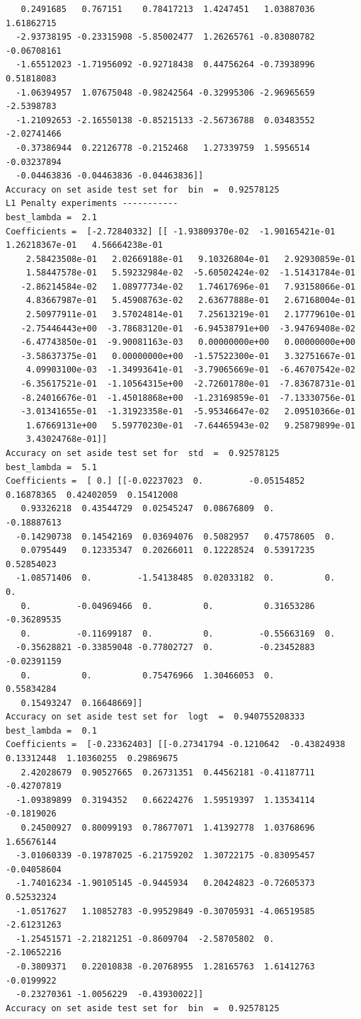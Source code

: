 \documentclass{article}
\begin{document}
\begin{tiny}
\begin{lstlisting}
   0.2491685   0.767151    0.78417213  1.4247451   1.03887036  1.61862715
  -2.93738195 -0.23315908 -5.85002477  1.26265761 -0.83080782 -0.06708161
  -1.65512023 -1.71956092 -0.92718438  0.44756264 -0.73938996  0.51818083
  -1.06394957  1.07675048 -0.98242564 -0.32995306 -2.96965659 -2.5398783
  -1.21092653 -2.16550138 -0.85215133 -2.56736788  0.03483552 -2.02741466
  -0.37386944  0.22126778 -0.2152468   1.27339759  1.5956514  -0.03237894
  -0.04463836 -0.04463836 -0.04463836]]
Accuracy on set aside test set for  bin  =  0.92578125
L1 Penalty experiments -----------
best_lambda =  2.1
Coefficients =  [-2.72840332] [[ -1.93809370e-02  -1.90165421e-01   1.26218367e-01   4.56664238e-01
    2.58423508e-01   2.02669188e-01   9.10326804e-01   2.92930859e-01
    1.58447578e-01   5.59232984e-02  -5.60502424e-02  -1.51431784e-01
   -2.86214584e-02   1.08977734e-02   1.74617696e-01   7.93158066e-01
    4.83667987e-01   5.45908763e-02   2.63677888e-01   2.67168004e-01
    2.50977911e-01   3.57024814e-01   7.25613219e-01   2.17779610e-01
   -2.75446443e+00  -3.78683120e-01  -6.94538791e+00  -3.94769408e-02
   -6.47743850e-01  -9.90081163e-03   0.00000000e+00   0.00000000e+00
   -3.58637375e-01   0.00000000e+00  -1.57522300e-01   3.32751667e-01
    4.09903100e-03  -1.34993641e-01  -3.79065669e-01  -6.46707542e-02
   -6.35617521e-01  -1.10564315e+00  -2.72601780e-01  -7.83678731e-01
   -8.24016676e-01  -1.45018868e+00  -1.23169859e-01  -7.13330756e-01
   -3.01341655e-01  -1.31923358e-01  -5.95346647e-02   2.09510366e-01
    1.67669131e+00   5.59770230e-01  -7.64465943e-02   9.25879899e-01
    3.43024768e-01]]
Accuracy on set aside test set for  std  =  0.92578125
best_lambda =  5.1
Coefficients =  [ 0.] [[-0.02237023  0.         -0.05154852  0.16878365  0.42402059  0.15412008
   0.93326218  0.43544729  0.02545247  0.08676809  0.         -0.18887613
  -0.14290738  0.14542169  0.03694076  0.5082957   0.47578605  0.
   0.0795449   0.12335347  0.20266011  0.12228524  0.53917235  0.52854023
  -1.08571406  0.         -1.54138485  0.02033182  0.          0.          0.
   0.         -0.04969466  0.          0.          0.31653286 -0.36289535
   0.         -0.11699187  0.          0.         -0.55663169  0.
  -0.35628821 -0.33859048 -0.77802727  0.         -0.23452883 -0.02391159
   0.          0.          0.75476966  1.30466053  0.          0.55834284
   0.15493247  0.16648669]]
Accuracy on set aside test set for  logt  =  0.940755208333
best_lambda =  0.1
Coefficients =  [-0.23362403] [[-0.27341794 -0.1210642  -0.43824938  0.13312448  1.10360255  0.29869675
   2.42028679  0.90527665  0.26731351  0.44562181 -0.41187711 -0.42707819
  -1.09389899  0.3194352   0.66224276  1.59519397  1.13534114 -0.1819026
   0.24500927  0.80099193  0.78677071  1.41392778  1.03768696  1.65676144
  -3.01060339 -0.19787025 -6.21759202  1.30722175 -0.83095457 -0.04058604
  -1.74016234 -1.90105145 -0.9445934   0.20424823 -0.72605373  0.52532324
  -1.0517627   1.10852783 -0.99529849 -0.30705931 -4.06519585 -2.61231263
  -1.25451571 -2.21821251 -0.8609704  -2.58705802  0.         -2.10652216
  -0.3809371   0.22010838 -0.20768955  1.28165763  1.61412763 -0.0199922
  -0.23270361 -1.0056229  -0.43930022]]
Accuracy on set aside test set for  bin  =  0.92578125


\end{lstlisting}
\end{tiny}
\end{document}
